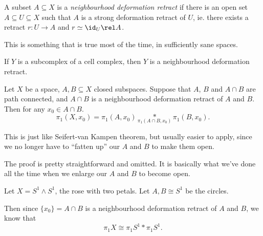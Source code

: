 \documentclass[a4paper]{article}
\begin{document}
\begin{defi}
  A subset $A\subseteq X$ is a \emph{neighbourhood deformation retract} if there is an open set $A\subseteq U\subseteq X$ such that $A$ is a strong deformation retract of $U$, ie. there exists a retract $r: U \to A$ and $r \simeq \id_U \rel A$.
\end{defi}
This is something that is true most of the time, in sufficiently sane spaces.

\begin{eg}
  If $Y$ is a subcomplex of a cell complex, then $Y$ is a neighbourhood deformation retract.
\end{eg}

\begin{thm}[]
  Let $X$ be a space, $A, B\subseteq X$ closed subspaces. Suppose that $A$, $B$ and $A\cap B$ are path connected, and $A\cap B$ is a neighbourhood deformation retract of $A$ and $B$. Then for any $x_0 \in A\cap B$.
  \[
    \pi_1(X, x_0) = \pi_1(A, x_0) \underset{\pi_1(A\cap B, x_0)}{*} \pi_1(B, x_0).
  \]
\end{thm}
\begin{center}
\end{center}
This is just like Seifert-van Kampen theorem, but usually easier to apply, since we no longer have to ``fatten up'' our $A$ and $B$ to make them open.

The proof is pretty straightforward and omitted. It is basically what we've done all the time when we enlarge our $A$ and $B$ to become open.

\begin{eg}
  Let $X = S^1 \wedge S^1$, the rose with two petals. Let $A, B\cong S^1$ be the circles.
  \begin{center}
  \end{center}
  Then since $\{x_0\} = A \cap B$ is a neighbourhood deformation retract of $A$ and $B$, we know that
  \[
    \pi_1 X \cong \pi_1 S^1 * \pi_1S^1.
  \]
\end{eg}
\end{document}
